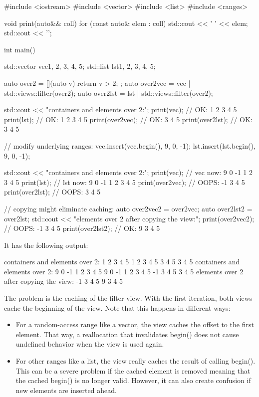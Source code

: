 \begin{cpp}
#include <iostream>
#include <vector>
#include <list>
#include <ranges>

void print(auto&& coll)
{
	for (const auto& elem : coll) {
		std::cout << ' ' << elem;
	}
	std::cout << '\n';
}

int main()
{
	std::vector vec{1, 2, 3, 4, 5};
	std::list lst{1, 2, 3, 4, 5};
	
	auto over2 = [](auto v) { return v > 2; };
	auto over2vec = vec | std::views::filter(over2);
	auto over2lst = lst | std::views::filter(over2);
	
	std::cout << "containers and elements over 2:\n";
	print(vec); // OK: 1 2 3 4 5
	print(lst); // OK: 1 2 3 4 5
	print(over2vec); // OK: 3 4 5
	print(over2lst); // OK: 3 4 5
	
	// modify underlying ranges:
	vec.insert(vec.begin(), {9, 0, -1});
	lst.insert(lst.begin(), {9, 0, -1});
	
	std::cout << "containers and elements over 2:\n";
	print(vec); // vec now: 9 0 -1 1 2 3 4 5
	print(lst); // lst now: 9 0 -1 1 2 3 4 5
	print(over2vec); // OOPS: -1 3 4 5
	print(over2lst); // OOPS: 3 4 5
	
	// copying might eliminate caching:
	auto over2vec2 = over2vec;
	auto over2lst2 = over2lst;
	std::cout << "elements over 2 after copying the view:\n";
	print(over2vec2); // OOPS: -1 3 4 5
	print(over2lst2); // OK: 9 3 4 5
	}
\end{cpp}

It has the following output:

{\footnotesize
\begin{shell}
containers and elements over 2:
1 2 3 4 5
1 2 3 4 5
3 4 5
3 4 5
containers and elements over 2:
9 0 -1 1 2 3 4 5
9 0 -1 1 2 3 4 5
-1 3 4 5
3 4 5
elements over 2 after copying the view:
-1 3 4 5
9 3 4 5
\end{shell}
}

The problem is the caching of the filter view. With the first iteration, both views cache the beginning of the view. Note that this happens in different ways:

\begin{itemize}
\item
For a random-access range like a vector, the view caches the offset to the first element. That way, a reallocation that invalidates begin() does not cause undefined behavior when the view is used again.

\item
For other ranges like a list, the view really caches the result of calling begin(). This can be a severe problem if the cached element is removed meaning that the cached begin() is no longer valid. However, it can also create confusion if new elements are inserted ahead.
\end{itemize}

